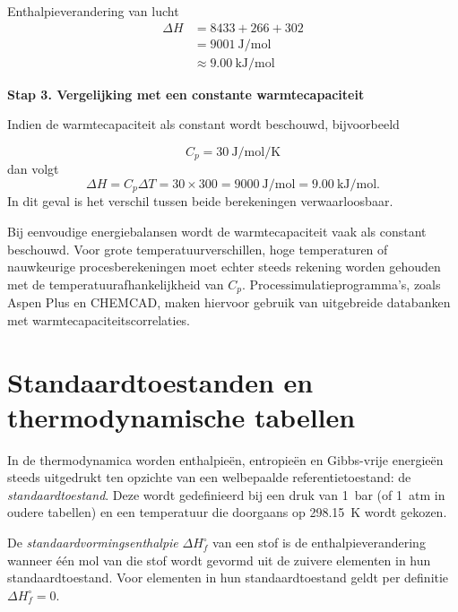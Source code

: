 \begin{voorbeeld}{Enthalpieverandering van lucht}
\begin{align*}
\Delta H
&= 8433 + 266 + 302
\\
&= \SI{9001}{\joule\per\mole}
\\
&\approx \SI{9.00}{\kilo\joule\per\mole}
\end{align*}

\bigskip

\textbf{Stap 3. Vergelijking met een constante warmtecapaciteit}

Indien de warmtecapaciteit als constant wordt beschouwd, bijvoorbeeld

\[
C_p=\SI{30}{\joule\per\mole\per\kelvin}
\]
dan volgt
\[
\Delta H = C_p\Delta T = 30\times300 = \SI{9000}{\joule\per\mole} = \SI{9.00}{\kilo\joule\per\mole}.
\]
In dit geval is het verschil tussen beide berekeningen verwaarloosbaar.
\end{voorbeeld}

Bij eenvoudige energiebalansen wordt de warmtecapaciteit vaak als constant beschouwd. Voor grote temperatuurverschillen, hoge temperaturen of nauwkeurige procesberekeningen moet echter steeds rekening worden gehouden met de temperatuurafhankelijkheid van $C_p$. Processimulatieprogramma's, zoals Aspen Plus en CHEMCAD, maken hiervoor gebruik van uitgebreide databanken met warmtecapaciteitscorrelaties.

\section{Standaardtoestanden en thermodynamische tabellen}

In de thermodynamica worden enthalpie\"en, entropie\"en en Gibbs-vrije energie\"en steeds uitgedrukt ten opzichte van een welbepaalde referentietoestand: de \emph{standaardtoestand}. Deze wordt gedefinieerd bij een druk van \SI{1}{\bar} (of \SI{1}{atm} in oudere tabellen) en een temperatuur die doorgaans op \SI{298.15}{\kelvin} wordt gekozen.

De \emph{standaardvormingsenthalpie} $\Delta H_f^\circ$ van een stof is de enthalpieverandering wanneer \'e\'en mol van die stof wordt gevormd uit de zuivere elementen in hun standaardtoestand. Voor elementen in hun standaardtoestand geldt per definitie $\Delta H_f^\circ = 0$.


